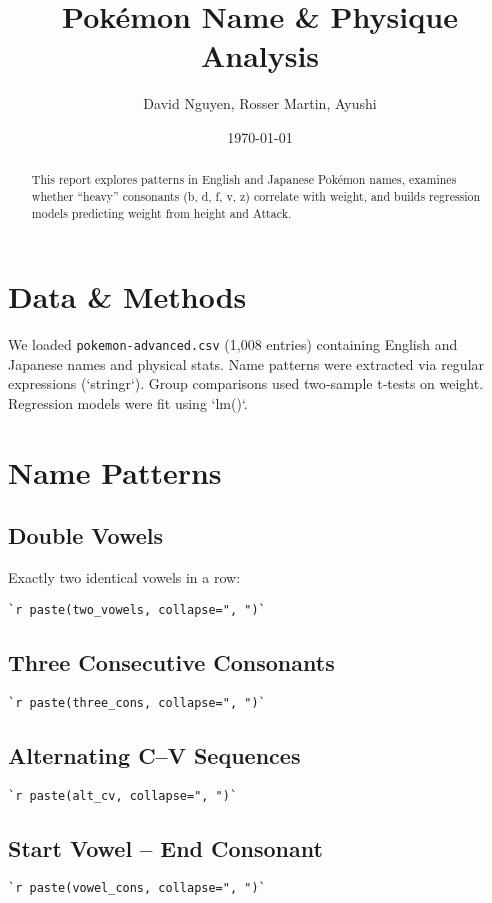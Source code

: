 \documentclass[11pt]{article}
\title{Pokémon Name \& Physique Analysis}
\author{David Nguyen, Rosser Martin, Ayushi}
\date{\today}
\begin{document}
\maketitle

\begin{abstract}
This report explores patterns in English and Japanese Pokémon names, examines whether “heavy” consonants (b, d, f, v, z) correlate with weight, and builds regression models predicting weight from height and Attack.
\end{abstract}

\section{Data \& Methods}
We loaded \texttt{pokemon-advanced.csv} (1,008 entries) containing English and Japanese names and physical stats. Name patterns were extracted via regular expressions (`stringr`). Group comparisons used two‐sample t‐tests on weight. Regression models were fit using `lm()`.

\section{Name Patterns}
\subsection{Double Vowels}
Exactly two identical vowels in a row:
\begin{verbatim}
`r paste(two_vowels, collapse=", ")`
\end{verbatim}

\subsection{Three Consecutive Consonants}
\begin{verbatim}
`r paste(three_cons, collapse=", ")`
\end{verbatim}

\subsection{Alternating C–V Sequences}
\begin{verbatim}
`r paste(alt_cv, collapse=", ")`
\end{verbatim}

\subsection{Start Vowel – End Consonant}
\begin{verbatim}
`r paste(vowel_cons, collapse=", ")`
\end{verbatim}
\end{document}
